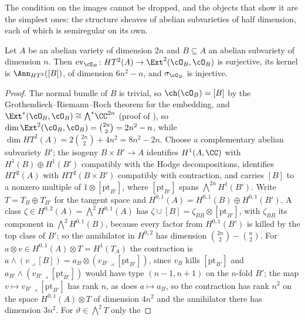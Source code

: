 The condition on the images cannot be dropped, and the objects that show it
are the simplest ones: the structure sheaves of abelian subvarieties of half
dimension, each of which is semiregular on its own.

\begin{lemma}
\label{lem:absemireg}
Let $A$ be an abelian variety of dimension $2n$ and $B\subseteq A$ an abelian
subvariety of dimension $n$. Then $\operatorname{ev}_{\cO_{B}}\colon
HT^{2}(A)\to\Ext^{2}(\cO_{B},\cO_{B})$ is surjective, its kernel is
$\Ann_{HT^{2}}([B])$, of dimension $6n^{2}-n$, and $\sigma_{\cO_{B}}$ is
injective.
\end{lemma}

\begin{proof}
The normal bundle of $B$ is trivial, so $\ch(\cO_{B})=[B]$ by the
Grothendieck--Riemann--Roch theorem for the embedding, and
$\Ext^{*}(\cO_{B},\cO_{B})\cong{\textstyle\bigwedge^{*}}\CC^{2n}$ (proof of
\cite[Corollary~3.17]{paperII}), so $\dim\Ext^{2}(\cO_{B},\cO_{B})=\binom{2n}{2}
=2n^{2}-n$, while $\dim HT^{2}(A)=2\binom{2n}{2}+4n^{2}=8n^{2}-2n$. Choose a
complementary abelian subvariety $B'$; the isogeny $B\times B'\to A$
identifies $H^{1}(A,\CC)$ with $H^{1}(B)\oplus H^{1}(B')$ compatibly with the
Hodge decompositions, identifies $HT^{2}(A)$ with $HT^{2}(B\times B')$
compatibly with contraction, and carries $[B]$ to a nonzero multiple of
$1\otimes[\mathrm{pt}_{B'}]$, where $[\mathrm{pt}_{B'}]$ spans
${\textstyle\bigwedge^{2n}}H^{1}(B')$. Write $T=T_{B}\oplus T_{B'}$ for the
tangent space and $H^{0,1}(A)=H^{0,1}(B)\oplus H^{0,1}(B')$. A class
$\zeta\in H^{0,2}(A)={\textstyle\bigwedge^{2}}H^{0,1}(A)$ has
$\zeta\cup[B]=\zeta_{BB}\otimes[\mathrm{pt}_{B'}]$, with $\zeta_{BB}$ its
component in ${\textstyle\bigwedge^{2}}H^{0,1}(B)$, because every factor from
$H^{0,1}(B')$ is killed by the top class of $B'$; so the annihilator in
$H^{0,2}$ has dimension $\binom{2n}{2}-\binom{n}{2}$. For $a\otimes v\in
H^{0,1}(A)\otimes T=H^{1}(T_{A})$ the contraction is $a\wedge(v\lrcorner[B])
=a_{B}\otimes(v_{B'}\lrcorner[\mathrm{pt}_{B'}])$, since $v_{B}$ kills
$[\mathrm{pt}_{B'}]$ and $a_{B'}\wedge(v_{B'}\lrcorner[\mathrm{pt}_{B'}])$
would have type $(n-1,n+1)$ on the $n$-fold $B'$; the map
$v\mapsto v_{B'}\lrcorner[\mathrm{pt}_{B'}]$ has rank $n$, as does
$a\mapsto a_{B}$, so the contraction has rank $n^{2}$ on the space
$H^{0,1}(A)\otimes T$ of dimension $4n^{2}$ and the annihilator there has
dimension $3n^{2}$. For $\vartheta\in{\textstyle\bigwedge^{2}}T$ only the

\end{proof}
